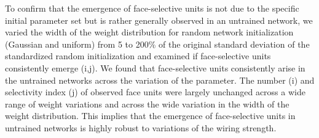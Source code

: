 \documentclass[sn-mathphys]{sn-jnl}%
\theoremstyle{thmstyleone}%
\theoremstyle{thmstyletwo}%
\theoremstyle{thmstylethree}%
\begin{document}
To confirm that the emergence of face-selective units is not due to the specific initial parameter set but is rather generally observed in an untrained network,
we varied the width of the weight distribution for random network initialization (Gaussian and uniform) from 5 to 200\% of the original standard deviation of the standardized random initialization and examined if face-selective units consistently emerge (i,j).
We found that face-selective units consistently arise in the untrained networks across the variation of the parameter.
The number (i) and selectivity index (j) of observed face units were largely unchanged across a wide range of weight variations and across the wide variation in the width of the weight distribution.
This implies that the emergence of face-selective units in untrained networks is highly robust to variations of the wiring strength.
\end{document}
